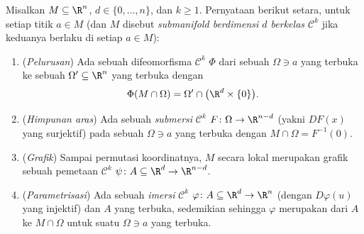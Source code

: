 \begin{theorem}
\label{thm:b3:submanifolds:characterizations}
Misalkan $M \subseteq \R^n$, $d \in \{0, \dots, n\}$, dan $k \geq
1$. Pernyataan berikut setara, untuk setiap titik $a \in M$
(dan $M$ disebut \emph{submanifold berdimensi $d$ berkelas
$\mathcal C^k$} jika keduanya berlaku di setiap $a
\in M$):
\begin{enumerate}
  \item (\emph{Pelurusan}) Ada sebuah difeomorfisma $\mathcal C^k$
        $\Phi$ dari sebuah $\Omega \ni a$ yang terbuka
        ke sebuah $\Omega' \subseteq \R^n$ yang terbuka dengan
        \[
        \Phi(M\cap\Omega) = \Omega' \cap
        \bigl(\R^d\times\{0\}\bigr).
        \]
  \item (\emph{Himpunan aras}) Ada sebuah \emph{submersi}
        $\mathcal C^k$ $F \colon \Omega \to \R^{n-d}$
        (yakni $DF(x)$ yang surjektif) pada sebuah $\Omega \ni a$ yang terbuka
        dengan $M\cap\Omega = F^{-1}(0)$.
  \item (\emph{Grafik}) Sampai permutasi koordinatnya, $M$ secara
        lokal merupakan grafik sebuah pemetaan $\mathcal C^k$ $\psi
        \colon A \subseteq \R^d \to \R^{n-d}$.
  \item (\emph{Parametrisasi}) Ada sebuah \emph{imersi}
        $\mathcal C^k$ $\varphi \colon A \subseteq \R^d \to
        \R^n$ (dengan $D\varphi(u)$ yang injektif) dan $A$ yang terbuka,
        sedemikian sehingga $\varphi$ merupakan  dari $A$ ke $M \cap
        \Omega$ untuk suatu $\Omega \ni a$ yang terbuka.
\end{enumerate}
\end{theorem}


